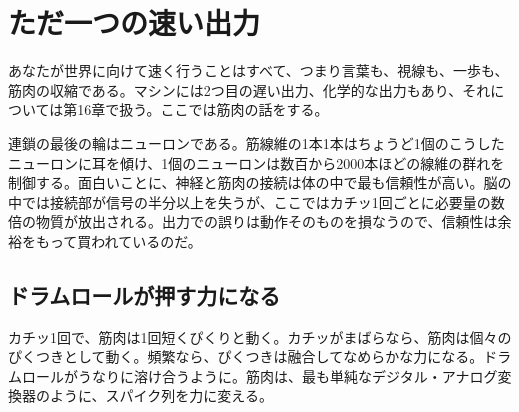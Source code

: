 \chapter{ただ一つの速い出力}

あなたが世界に向けて速く行うことはすべて、つまり言葉も、視線も、一歩も、筋肉の収縮である。マシンには2つ目の遅い出力、化学的な出力もあり、それについては第16章で扱う。ここでは筋肉の話をする。

連鎖の最後の輪はニューロンである。筋線維の1本1本はちょうど1個のこうしたニューロンに耳を傾け、1個のニューロンは数百から2000本ほどの線維の群れを制御する。面白いことに、神経と筋肉の接続は体の中で最も信頼性が高い。脳の中では接続部が信号の半分以上を失うが、ここではカチッ1回ごとに必要量の数倍の物質が放出される。出力での誤りは動作そのものを損なうので、信頼性は余裕をもって買われているのだ。

\section*{ドラムロールが押す力になる}

カチッ1回で、筋肉は1回短くぴくりと動く。カチッがまばらなら、筋肉は個々のぴくつきとして動く。頻繁なら、ぴくつきは融合してなめらかな力になる。ドラムロールがうなりに溶け合うように。筋肉は、最も単純なデジタル・アナログ変換器のように、スパイク列を力に変える。

